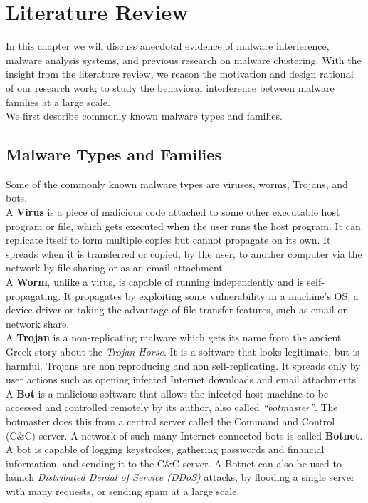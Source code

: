 \chapter{Literature Review}\label{chapter:literature_review}
In this chapter we will discuss anecdotal evidence of malware interference, malware analysis systems, and previous research on malware clustering.
With the insight from the literature review, we reason the motivation and design rational of our research work; to study the behavioral interference between malware families at a large scale.\\
We first describe commonly known malware types and families.

\section{Malware Types and Families}
\label{sec:Malware Types and Families}
Some of the commonly known malware types are viruses, worms, Trojans, and bots.\\
A \textbf{Virus} is a piece of malicious code attached to some other executable host program or file, which gets executed when the user runs the host program.
It can replicate itself to form multiple copies but cannot propagate on its own.
It spreads when it is transferred or copied, by the user, to another computer via the network by file sharing or as an email attachment.\\
A \textbf{Worm}, unlike a virus, is capable of running independently and is self-propagating.
It propagates by exploiting some vulnerability in a machine's OS, a device driver or taking the advantage of file-transfer features, such as email or network share.\\
A \textbf{Trojan} is a non-replicating malware which gets its name from the ancient Greek story about the \textit{Trojan Horse}.
It is a software that looks legitimate, but is harmful.
Trojans are non reproducing and non self-replicating.
It spreads only by user actions such as opening infected Internet downloads and email attachments~\cite[]{ciscodif} \\
A \textbf{Bot} is a malicious software that allows the infected host machine to be accessed and controlled remotely by its author, also called \emph{``botmaster''}.
The botmaster does this from a central server called the Command and Control (C\&C) server.
A network of such many Internet-connected bots is called \textbf{Botnet}.
A bot is capable of logging keystrokes, gathering passwords and financial information, and sending it to the C\&C server.
A Botnet can also be used to launch \emph{Distributed Denial of Service (DDoS)} attacks, by flooding a single server with many requests, or sending spam at a large scale.\\

